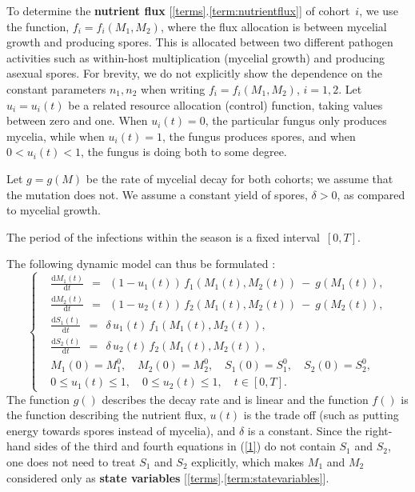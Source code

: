 \documentclass[11pt]{amsart}
\begin{document}
To determine the \textbf{nutrient flux} [\ref{terms}.\ref{term:nutrientflux}]
of cohort~$ i $, we use the function,
$ f_i = f_i(M_1, M_2) $, where the flux allocation is between mycelial growth and producing spores. This is allocated between two different pathogen
activities such as within-host multiplication (mycelial growth) and producing
asexual spores. For brevity, we do not explicitly show the dependence on the
constant parameters $ n_1, n_2 $ when writing $ f_i = f_i(M_1, M_2) $,
$ i = 1,2 $. Let $ u_i = u_i(t) $ be a related resource allocation (control)
function, taking values between zero and one. 
When $ u_i(t) = 0 $, the particular fungus only produces mycelia, while when $ u_i(t) = 1 $, the fungus produces spores, and when $ 0 < u_i(t) < 1 $, the fungus is doing both to some degree.

Let $ g = g(M) $ be the rate of mycelial decay for both cohorts; we assume that the mutation does not. We assume a constant yield of spores, $ \delta > 0 $, as compared to mycelial growth. 

The period of the infections within the season is a fixed interval~$ [0, T] $.

The following dynamic model can thus be formulated 
\cite{YegorovGrognardMailleretHalkettBernhard2019}:
\begin{equation}
\left\{ \begin{aligned}
& \frac{\mathrm{d} M_1(t)}{\mathrm{d} t} \:\: = \:\: \left(1 - u_1(t)\right) \,
  f_1\left(M_1(t), M_2(t)\right) \: - \: g\left(M_1(t)\right), \\
& \frac{\mathrm{d} M_2(t)}{\mathrm{d} t} \:\: = \:\: \left(1 - u_2(t)\right) \,
  f_2\left(M_1(t), M_2(t)\right) \: - \: g\left(M_2(t)\right), \\
& \frac{\mathrm{d} S_1(t)}{\mathrm{d} t} \:\: = \:\: \delta \, u_1(t) \,
  f_1\left(M_1(t), M_2(t)\right), \\
& \frac{\mathrm{d} S_2(t)}{\mathrm{d} t} \:\: = \:\: \delta \, u_2(t) \,
  f_2\left(M_1(t), M_2(t)\right), \\
& M_1(0) = M_1^0, \quad M_2(0) = M_2^0, \quad S_1(0) = S_1^0,
  \quad S_2(0) = S_2^0, \\
& 0 \leqslant u_1(t) \leqslant 1, \quad 0 \leqslant u_2(t) \leqslant 1,
  \quad t \in [0, T].
\end{aligned} \right.  \label{1}
\end{equation}
The function $g()$ describes the decay rate and is linear and the function $f()$ is the function describing the nutrient flux, $u(t)$ is the trade off (such as putting energy towards spores instead of mycelia), and $\delta$ is a constant.
Since the right-hand sides of the third and fourth equations in (\ref{1}) do
not contain $ S_1 $ and $ S_2 $, one does not need to treat $ S_1 $ and $ S_2 $
explicitly, which makes $ M_1 $ and $ M_2 $ considered only as \textbf{state variables} [\ref{terms}.\ref{term:statevariables}].
\end{document}
